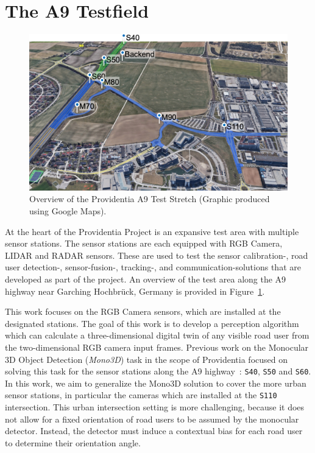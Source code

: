 
\section{The A9 Testfield}
\label{sec:a9testfield}

\begin{figure}[htb]
    \includegraphics[width=\linewidth]{figures/teststrecke-gesamt}
    \caption{Overview of the Providentia A9 Test Stretch (Graphic produced using Google Maps).}
    \label{fig:providentia-test-area}
\end{figure}

At the heart of the Providentia Project is an expansive test area with multiple sensor stations.
The sensor stations are each equipped with RGB Camera, LIDAR and RADAR sensors.
These are used to test the sensor calibration-, road user detection-, sensor-fusion-, tracking-, and communication-solutions that are developed as part of the project.
An overview of the test area along the A9 highway near Garching Hochbrück, Germany is provided in Figure~\ref{fig:providentia-test-area}.

This work focuses on the RGB Camera sensors, which are installed at the designated stations.
The goal of this work is to develop a perception algorithm which can calculate a three-dimensional digital twin of any visible road user from the two-dimensional RGB camera input frames.
Previous work on the Monocular 3D Object Detection (\textit{Mono3D}) task in the scope of Providentia focused on solving this task for the sensor stations along the A9 highway~\cite{leonthesis}: \texttt{S40}, \texttt{S50} and \texttt{S60}.
In this work, we aim to generalize the Mono3D solution to cover the more urban sensor stations, in particular the cameras which are installed at the \texttt{S110} intersection.
This urban intersection setting is more challenging, because it does not allow for a fixed orientation of road users to be assumed by the monocular detector.
Instead, the detector must induce a contextual bias for each road user to determine their orientation angle.

